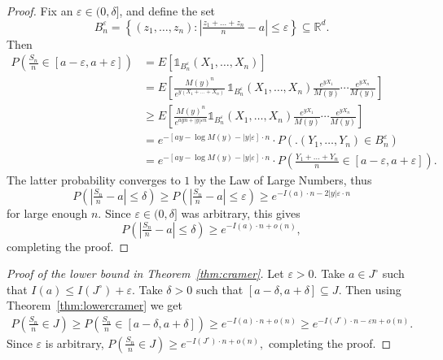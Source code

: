 \documentclass[12pt]{article}
\theoremstyle{definition}
\newcommand{\E}{\mathbb{E}}
\newcommand{\I}{\mathds{1}}
\renewcommand{\P}{\mathbb{P}}
\newcommand{\R}{\mathbb{R}}
\renewcommand{\ge}{\geqslant}
\renewcommand{\le}{\leqslant}
\newcommand{\y}{y}
\renewcommand{\E}{E}
\renewcommand{\P}{P}
\begin{document}
\begin{proof}
Fix an $\varepsilon \in (0,\delta]$, and define the set
\[
B^{\varepsilon}_n = \left\{ (z_1,\dots,z_n) : \left| \tfrac{z_1+\dots+z_n}{n} - a \right | \le \varepsilon \right\}
\subseteq \R^d
.
\]
Then
\begin{align*}
\P\left( \tfrac{S_n}{n} \in [a-\varepsilon,a+\varepsilon] \right)
& =
\E\left[ \I_{B^{\varepsilon}_n}(X_1,\dots,X_n) \right]
\\
& =
\E\left[ \tfrac{M(\y)^n}{ e^{\y (X_1+\dots+X_n)} } \,
\I_{B^{\varepsilon}_n}(X_1,\dots,X_n)
\tfrac{ e^{\y X_1} }{M(\y)} \cdots \tfrac{ e^{\y X_n} }{M(\y)}
\right]
\\
& \ge
\E\left[
\frac{M(\y)^n}{ e^{a \y n + |\y| \varepsilon n} }
\I_{B^{\varepsilon}_n}(X_1,\dots,X_n)
\tfrac{ e^{\y X_1} }{M(\y)} \cdots \tfrac{ e^{\y X_n} }{M(\y)}
\right]
\\
& =
e^{-\left[ a\y - \log M(\y) - |\y|\varepsilon \right] \cdot n }
\cdot
\P\left( \big. (Y_1,\dots,Y_n) \in B^{\varepsilon}_n \right)
\\
& =
e^{-\left[ a\y - \log M(\y) - |\y|\varepsilon \right] \cdot n }
\cdot
\P\left( \tfrac{Y_1+\dots+Y_n}{n} \in [a-\varepsilon,a+\varepsilon] \right)
.
\end{align*}
The latter probability converges to $1$ by the Law of Large Numbers, thus
\[
\P\left( \left| \tfrac{S_n}{n} -a \right| \le \delta \right)
\ge
\P\left( \left| \tfrac{S_n}{n} -a \right| \le \varepsilon \right)
\ge
e^{-I(a)\cdot n - 2|\y|\varepsilon \cdot n }
\]
for large enough $n$.
Since $\varepsilon \in (0,\delta]$ was arbitrary, this gives
\[
\P\left( \left| \tfrac{S_n}{n} -a \right| \le \delta \right)
\ge
e^{-I(a)\cdot n + o(n) }
,
\]
completing the proof.
\end{proof}

\begin{proof}
[Proof of the lower bound in Theorem~\ref{thm:cramer}]
Let $\varepsilon>0$.
Take $a\in J^\circ$ such that $I(a) \le I(J^\circ) + \varepsilon$.
Take $\delta>0$ such that $[a-\delta,a+\delta] \subseteq J$.
Then using Theorem~\ref{thm:lowercramer} we get
\begin{align*}
\P\left( \tfrac{S_n}{n} \in J \right)
\ge
\P\left( \tfrac{S_n}{n} \in [a-\delta,a+\delta] \right)
\ge
e^{-I(a)\cdot n + o(n)}
\ge
e^{-I(J^\circ) \cdot n -\varepsilon n +  o(n)}
.
\end{align*}
Since $\varepsilon$ is arbitrary,
\(
\P\left( \tfrac{S_n}{n} \in J \right)
\ge
e^{-I(J^\circ) \cdot n +  o(n)}
,
\)
completing the proof.
\end{proof}
\end{document}
